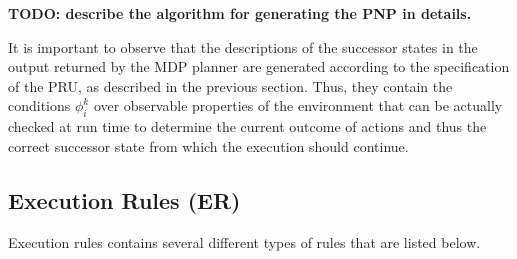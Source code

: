 \vspace{0.5cm}
{\bf TODO: describe the algorithm for generating the PNP in details.}
\vspace{0.5cm}


It is important to observe that the descriptions of the successor states in the output returned by the MDP planner are generated according to the specification of the PRU, as described in the previous section. Thus, they contain the conditions $\phi_i^k$ over observable properties of the environment that can be actually checked at run time to determine the current outcome of actions and thus the correct successor state from which the execution should continue.





\subsection{Execution Rules (ER)}

Execution rules contains several different types of rules that are listed below.

